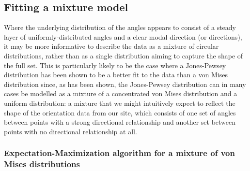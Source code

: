 \documentclass[../../ArchStats.tex]{subfiles}
\begin{document}






\subsection{Fitting a mixture model}


 Where the underlying distribution of the angles appears to consist of a steady layer of uniformly-distributed angles and a clear modal direction (or directions), it may be more informative to describe the data as a mixture of circular distributions, rather than as a single distribution aiming to capture the shape of the full set. This is particularly likely to be the case where a Jones-Pewsey distribution has been shown to be a better fit to the data than a von Mises distribution  since, as \nb{!} has been shown, the Jones-Pewsey distribution can in many cases be modelled as a mixture of a concentrated von Mises distribution and a uniform distribution: a mixture that we might intuitively expect to reflect the shape of the orientation data from our site, which consists of one set of angles between points with a strong directional relationship and another set between points with no directional relationship at all.


\subsubsection{Expectation-Maximization algorithm for a mixture of von Mises distributions}
\end{document}
